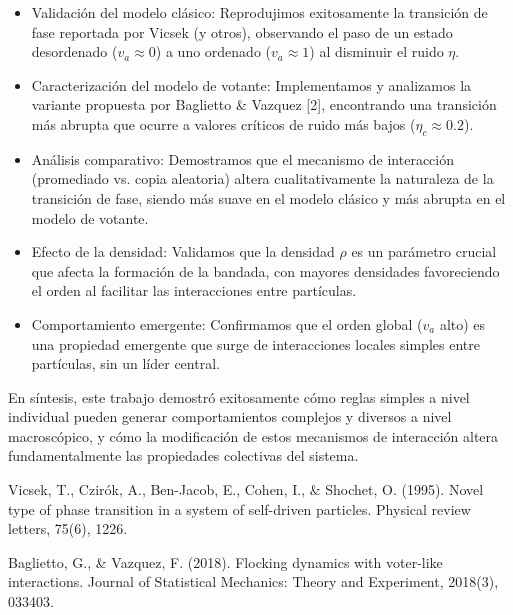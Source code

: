 \documentclass{article}
\begin{document}
\begin{itemize}
    \item  Validación del modelo clásico: Reprodujimos exitosamente la transición de fase reportada por Vicsek (y otros), observando el paso de un estado desordenado ($v_a \approx 0$) a uno ordenado ($v_a \approx 1$) al disminuir el ruido $\eta$.

    \item Caracterización del modelo de votante: Implementamos y analizamos la variante propuesta por Baglietto \& Vazquez [2], encontrando una transición más abrupta que ocurre a valores críticos de ruido más bajos ($\eta_c \approx 0.2$).

    \item  Análisis comparativo: Demostramos que el mecanismo de interacción (promediado vs. copia aleatoria) altera cualitativamente la naturaleza de la transición de fase, siendo más suave en el modelo clásico y más abrupta en el modelo de votante.

    \item  Efecto de la densidad: Validamos que la densidad $\rho$ es un parámetro crucial que afecta la formación de la bandada, con mayores densidades favoreciendo el orden al facilitar las interacciones entre partículas.

    \item  Comportamiento emergente: Confirmamos que el orden global ($v_a$ alto) es una propiedad emergente que surge de interacciones locales simples entre partículas, sin un líder central.
\end{itemize}

En síntesis, este trabajo demostró exitosamente cómo reglas simples a nivel individual pueden generar comportamientos complejos y diversos a nivel macroscópico, y cómo la modificación de estos mecanismos de interacción altera fundamentalmente las propiedades colectivas del sistema.


\begin{thebibliography}{9}
Vicsek, T., Czirók, A., Ben-Jacob, E., Cohen, I., \& Shochet, O. (1995). Novel type of phase transition in a system of self-driven particles. Physical review letters, 75(6), 1226.

Baglietto, G., \& Vazquez, F. (2018). Flocking dynamics with voter-like interactions. Journal of Statistical Mechanics: Theory and Experiment, 2018(3), 033403.
\end{thebibliography}
\end{document}
